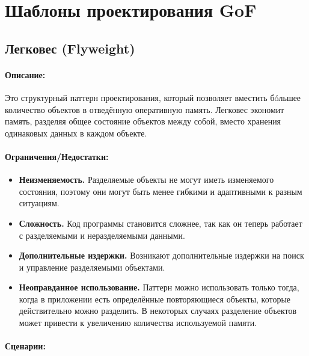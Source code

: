 \documentclass[12pt,onecolumn]{article}
\newcommand{\nparagraph}[1]{\paragraph{#1}\mbox{}\\}
\begin{document}
\section{Шаблоны проектирования GoF}
\subsection{Легковес (Flyweight)}
\paragraph{Описание:}
Это структурный паттерн проектирования, который позволяет вместить бóльшее количество объектов в отведённую оперативную память. Легковес экономит память, разделяя общее состояние объектов между собой, вместо хранения одинаковых данных в каждом объекте.
\paragraph{Ограничения/Недостатки:}
\begin{itemize}
  \item \textbf{Неизменяемость.} Разделяемые объекты не могут иметь изменяемого состояния, поэтому они могут быть менее гибкими и адаптивными к разным ситуациям.
  \item \textbf{Сложность.} Код программы становится сложнее, так как он теперь работает с разделяемыми и неразделяемыми данными.
  \item \textbf{Дополнительные издержки.} Возникают дополнительные издержки на поиск и управление разделяемыми объектами.
  \item \textbf{Неоправданное использование.} Паттерн можно использовать только тогда, когда в приложении есть определённые повторяющиеся объекты, которые действительно можно разделить. В некоторых случаях разделение объектов может привести к увеличению количества используемой памяти.
\end{itemize}
\nparagraph{Сценарии:}
\end{document}
